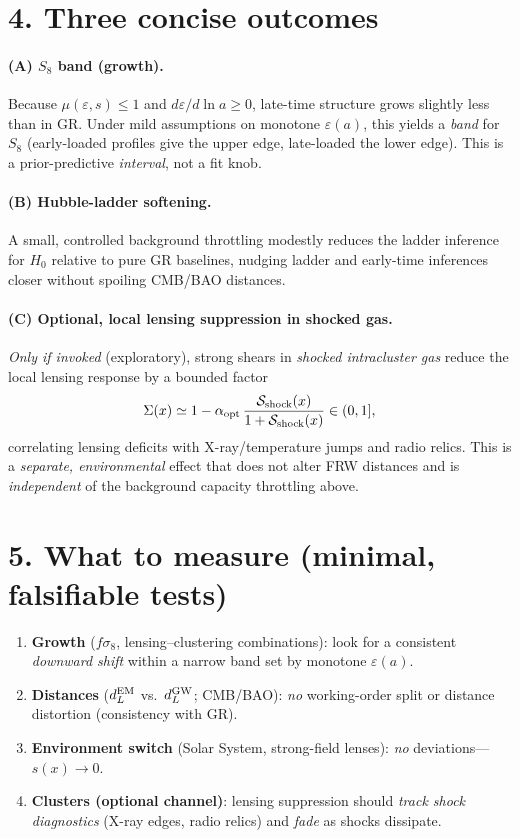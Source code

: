 \documentclass[aps,prd,onecolumn,superscriptaddress,nofootinbib]{revtex4-2}
\newcommand{\eps}{\varepsilon}
\newcommand{\Sig}{\Sigma}
\begin{document}
\section*{4. Three concise outcomes}
\paragraph*{(A) $S_8$ band (growth).}
Because $\mu(\eps,s)\!\le\!1$ and $d\eps/d\ln a\!\ge\!0$, late-time structure grows slightly less than in GR. Under mild assumptions on monotone $\eps(a)$, this yields a \emph{band} for $S_8$ (early-loaded profiles give the upper edge, late-loaded the lower edge). This is a prior-predictive \emph{interval}, not a fit knob.

\paragraph*{(B) Hubble-ladder softening.}
A small, controlled background throttling modestly reduces the ladder inference for $H_0$ relative to pure GR baselines, nudging ladder and early-time inferences closer without spoiling CMB/BAO distances.

\paragraph*{(C) Optional, local lensing suppression in shocked gas.}
\emph{Only if invoked} (exploratory), strong shears in \emph{shocked intracluster gas} reduce the local lensing response by a bounded factor
\[
\Sig(x)\simeq 1-\alpha_{\rm opt}\,\frac{\mathcal{S}_{\rm shock}(x)}{1+\mathcal{S}_{\rm shock}(x)} \in (0,1],
\]
correlating lensing deficits with X-ray/temperature jumps and radio relics. This is a \emph{separate, environmental} effect that does not alter FRW distances and is \emph{independent} of the background capacity throttling above.

\section*{5. What to measure (minimal, falsifiable tests)}
\begin{enumerate}
\item \textbf{Growth} ($f\sigma_8$, lensing–clustering combinations): look for a consistent \emph{downward shift} within a narrow band set by monotone $\eps(a)$.
\item \textbf{Distances} ($d_L^{\rm EM}$ vs.\ $d_L^{\rm GW}$; CMB/BAO): \emph{no} working-order split or distance distortion (consistency with GR).
\item \textbf{Environment switch} (Solar System, strong-field lenses): \emph{no} deviations—$s(x)\to 0$.
\item \textbf{Clusters (optional channel)}: lensing suppression should \emph{track shock diagnostics} (X-ray edges, radio relics) and \emph{fade} as shocks dissipate.
\end{enumerate}
\end{document}
